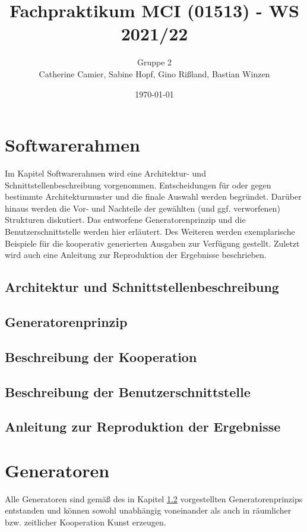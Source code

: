 \documentclass{article}
\title{Fachpraktikum MCI (01513) - WS 2021/22}
\author{Gruppe 2\\
	Catherine Camier, Sabine Hopf, Gino Rißland, Bastian Winzen}
\date{\today}
\begin{document}
	
	\maketitle
	\thispagestyle{empty}
	\newpage
	\setcounter{page}{1}
	\tableofcontents
	\newpage
	
	\listoffigures
	
	\listoftables
	\newpage
	
	
	\section{Softwarerahmen}
Im Kapitel Softwarerahmen wird eine Architektur- und Schnittstellenbeschreibung vorgenommen. Entscheidungen für oder gegen bestimmte Architekturmuster und die finale Auswahl werden begründet. Darüber hinaus werden die Vor- und Nachteile der gewählten (und ggf. verworfenen) Strukturen diskutiert. Das entworfene  Generatorenprinzip und die Benutzerschnittstelle werden hier erläutert. Des Weiteren werden exemplarische Beispiele für die kooperativ generierten Ausgaben zur Verfügung gestellt. Zuletzt wird auch eine Anleitung zur Reproduktion der Ergebnisse beschrieben.
		\subsection{Architektur und Schnittstellenbeschreibung}
			
		\subsection{Generatorenprinzip}\label{generatorenprinzip}
			
		\subsection{Beschreibung der Kooperation}
			
			\clearpage
		\subsection{Beschreibung der Benutzerschnittstelle}
					
		\subsection{Anleitung zur Reproduktion der Ergebnisse}
		
		\clearpage
	\section{Generatoren}
Alle Generatoren sind gemäß des in Kapitel \ref{generatorenprinzip} vorgestellten Generatorenprinzips entstanden und können sowohl unabhängig voneinander als auch in räumlicher bzw. zeitlicher Kooperation Kunst erzeugen.
\end{document}
